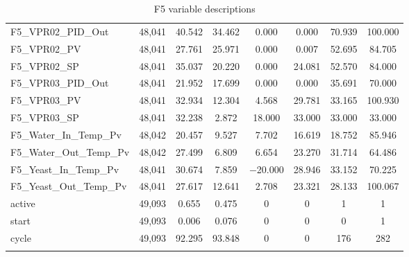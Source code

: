 \begin{table}[!htbp]
{\begin{tabular}{@{\extracolsep{5pt}}lccccccc}
F5\_VPR02\_PID\_Out & 48,041 & 40.542 & 34.462 & 0.000 & 0.000 & 70.939 & 100.000 \\ 
F5\_VPR02\_PV & 48,041 & 27.761 & 25.971 & 0.000 & 0.007 & 52.695 & 84.705 \\ 
F5\_VPR02\_SP & 48,041 & 35.037 & 20.220 & 0.000 & 24.081 & 52.570 & 84.000 \\ 
F5\_VPR03\_PID\_Out & 48,041 & 21.952 & 17.699 & 0.000 & 0.000 & 35.691 & 70.000 \\ 
F5\_VPR03\_PV & 48,041 & 32.934 & 12.304 & 4.568 & 29.781 & 33.165 & 100.930 \\ 
F5\_VPR03\_SP & 48,041 & 32.238 & 2.872 & 18.000 & 33.000 & 33.000 & 33.000 \\ 
F5\_Water\_In\_Temp\_Pv & 48,042 & 20.457 & 9.527 & 7.702 & 16.619 & 18.752 & 85.946 \\ 
F5\_Water\_Out\_Temp\_Pv & 48,042 & 27.499 & 6.809 & 6.654 & 23.270 & 31.714 & 64.486 \\ 
F5\_Yeast\_In\_Temp\_Pv & 48,041 & 30.674 & 7.859 & $-$20.000 & 28.946 & 33.152 & 70.225 \\ 
F5\_Yeast\_Out\_Temp\_Pv & 48,041 & 27.617 & 12.641 & 2.708 & 23.321 & 28.133 & 100.067 \\ 
active & 49,093 & 0.655 & 0.475 & 0 & 0 & 1 & 1 \\ 
start & 49,093 & 0.006 & 0.076 & 0 & 0 & 0 & 1 \\ 
cycle & 49,093 & 92.295 & 93.848 & 0 & 0 & 176 & 282 \\ 
\hline \\[-1.8ex] 
\end{tabular} 
}
  \caption{F5 variable descriptions} 
  \label{tab:f5} 
\end{table} 